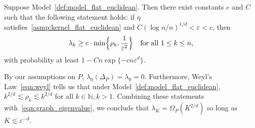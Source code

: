\begin{proposition}
	\label{prop:graph_eigenvalue}
	Suppose Model~\ref{def:model_flat_euclidean}. Then there exist constants $c$ and $C$ such that the following statement holds: if $\eta$ satisfies~\ref{asmp:kernel_flat_euclidean} and $C(\log n/n)^{1/d} < \varepsilon < c$, then
	\begin{equation}
	\label{eqn:graph_eigenvalue}
	\lambda_k \geq c \cdot \min\Bigl\{\rho_k, \frac{1}{\varepsilon^{2}} \Bigr\} \quad \textrm{for all $1 \leq k \leq n$,}
	\end{equation}
	with probability at least $1 - Cn\exp\{-c n\varepsilon^d\}$. 
\end{proposition}
By our assumptions on $P$, $\lambda_0(\Delta_P) = \lambda_0 = 0$. Furthermore, Weyl's Law~\eqref{eqn:weyl} tells us that under Model~\ref{def:model_flat_euclidean}, $k^{2/d} \lesssim \rho_k \lesssim k^{2/d}$ for all $k \in \mathbb{N}, k > 1$. Combining these statements with~\eqref{eqn:graph_eigenvalue}, we conclude that $\lambda_{K} = \Omega_P(K^{2/d})$ so long as $K \lesssim \varepsilon^{-d}$. 

